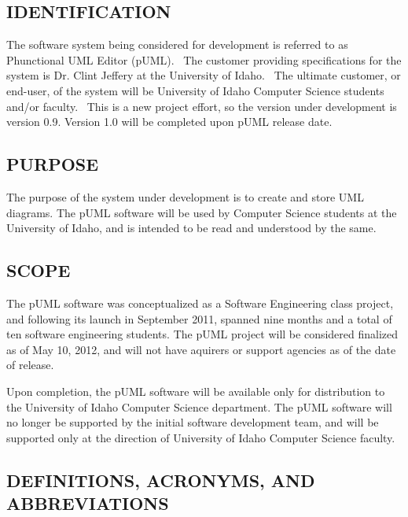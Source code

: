 \documentclass[twoside,letterpaper]{article}
\begin{document}
\subsection[IDENTIFICATION]{\bfseries
IDENTIFICATION}
{
The software system being considered for development is referred to as Phunctional UML Editor (pUML). \ The customer providing specifications
for the system is Dr. Clint Jeffery at the University of Idaho. \ The ultimate
customer, or end-user, of the system will be University of Idaho Computer Science students and/or faculty. \ This is a new project effort, so the version under development is version 0.9.
\newline Version 1.0 will be completed upon pUML release date.}

\subsection[PURPOSE]{\bfseries
PURPOSE}
{
The purpose of the system under development is to create and store UML diagrams.
\newline The pUML software will be used by Computer Science students at the University of Idaho, and is intended to be read and understood by the same.}

\subsection[SCOPE]{\bfseries
SCOPE}
{
The pUML software was conceptualized as a Software Engineering class project, and following its launch in September 2011, spanned nine months and a total of ten software engineering students. The pUML project will be considered finalized as of May 10, 2012, and will not have aquirers or support agencies as of the date of release. 

\bigskip

Upon completion, the pUML software will be available only for distribution to the University of Idaho Computer Science department.  The pUML software will no longer be supported by the initial software development team, and will be supported only at the direction of University of Idaho Computer Science faculty. }

\subsection[DEFINITIONS, ACRONYMS, AND
ABBREVIATIONS]{\bfseries
DEFINITIONS, ACRONYMS, AND ABBREVIATIONS}

\bigskip
\end{document}
